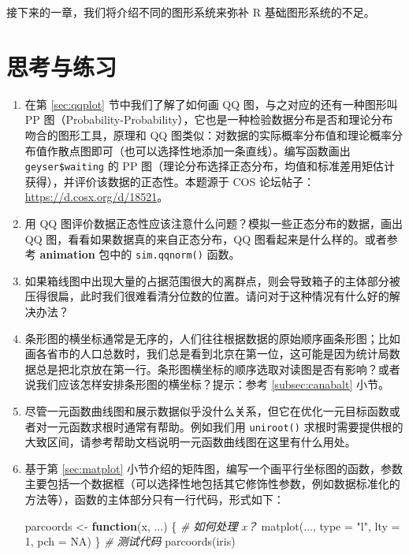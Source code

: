 \documentclass[
  b5paper,
  UTF8,twoside]{book}
\newenvironment{Shaded}{\begin{snugshade}}{\end{snugshade}}
\newcommand{\AttributeTok}[1]{\textcolor[rgb]{0.77,0.63,0.00}{#1}}
\newcommand{\CommentTok}[1]{\textcolor[rgb]{0.56,0.35,0.01}{\textit{#1}}}
\newcommand{\ConstantTok}[1]{\textcolor[rgb]{0.00,0.00,0.00}{#1}}
\newcommand{\ControlFlowTok}[1]{\textcolor[rgb]{0.13,0.29,0.53}{\textbf{#1}}}
\newcommand{\DecValTok}[1]{\textcolor[rgb]{0.00,0.00,0.81}{#1}}
\newcommand{\FunctionTok}[1]{\textcolor[rgb]{0.00,0.00,0.00}{#1}}
\newcommand{\NormalTok}[1]{#1}
\newcommand{\OtherTok}[1]{\textcolor[rgb]{0.56,0.35,0.01}{#1}}
\newcommand{\StringTok}[1]{\textcolor[rgb]{0.31,0.60,0.02}{#1}}
\begin{document}
接下来的一章，我们将介绍不同的图形系统来弥补 R 基础图形系统的不足。

\hypertarget{ux601dux8003ux4e0eux7ec3ux4e60-3}{%
\section{思考与练习}\label{ux601dux8003ux4e0eux7ec3ux4e60-3}}

\begin{enumerate}
\def\labelenumi{\arabic{enumi}.}
\item
  在第 \ref{sec:qqplot} 节中我们了解了如何画 QQ 图，与之对应的还有一种图形叫 PP 图（Probability-Probability），它也是一种检验数据分布是否和理论分布吻合的图形工具，原理和 QQ 图类似：对数据的实际概率分布值和理论概率分布值作散点图即可（也可以选择性地添加一条直线）。编写函数画出 \texttt{geyser\$waiting} 的 PP 图（理论分布选择正态分布，均值和标准差用矩估计获得），并评价该数据的正态性。本题源于 COS 论坛帖子：\url{https://d.cosx.org/d/18521}。
\item
  用 QQ 图评价数据正态性应该注意什么问题？模拟一些正态分布的数据，画出 QQ 图，看看如果数据真的来自正态分布，QQ 图看起来是什么样的。或者参考 \textbf{animation} 包中的 \texttt{sim.qqnorm()} 函数。
\item
  如果箱线图中出现大量的占据范围很大的离群点，则会导致箱子的主体部分被压得很扁，此时我们很难看清分位数的位置。请问对于这种情况有什么好的解决办法？
\item
  条形图的横坐标通常是无序的，人们往往根据数据的原始顺序画条形图；比如画各省市的人口总数时，我们总是看到北京在第一位，这可能是因为统计局数据总是把北京放在第一行。条形图横坐标的顺序选取对读图是否有影响？或者说我们应该怎样安排条形图的横坐标？提示：参考 \ref{subsec:canabalt} 小节。
\item
  尽管一元函数曲线图和展示数据似乎没什么关系，但它在优化一元目标函数或者对一元函数求根时通常有帮助。例如我们用 \texttt{uniroot()} 求根时需要提供根的大致区间，请参考帮助文档说明一元函数曲线图在这里有什么用处。
\item
  基于第 \ref{sec:matplot} 小节介绍的矩阵图，编写一个画平行坐标图的函数，参数主要包括一个数据框（可以选择性地包括其它修饰性参数，例如数据标准化的方法等），函数的主体部分只有一行代码，形式如下：

\begin{Shaded}
\begin{Highlighting}[]
\NormalTok{parcoords }\OtherTok{\textless{}{-}} \ControlFlowTok{function}\NormalTok{(x, ...) \{}
  \CommentTok{\# 如何处理 x？}
  \FunctionTok{matplot}\NormalTok{(..., }\AttributeTok{type =} \StringTok{"l"}\NormalTok{, }\AttributeTok{lty =} \DecValTok{1}\NormalTok{, }\AttributeTok{pch =} \ConstantTok{NA}\NormalTok{)}
\NormalTok{\}}
\CommentTok{\# 测试代码}
\FunctionTok{parcoords}\NormalTok{(iris)}
\end{Highlighting}
\end{Shaded}


\end{enumerate}
\end{document}
